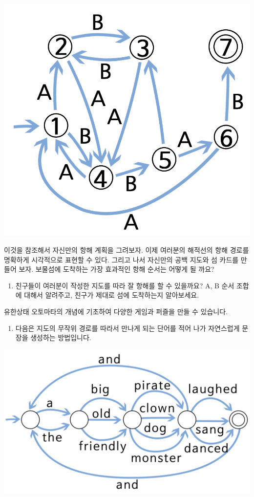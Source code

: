 \documentclass[]{article}
\begin{document}
\includegraphics{csunplugged/03-part/img/ch12-fsm/11-fsm-06-worksheet-01.png}

이것을 참조해서 자신만의 항해 계획을 그려보자. 이제 여러분의 해적선의
항해 경로를 명확하게 시각적으로 표현할 수 있다. 그리고 나서 자신만의
공백 지도와 섬 카드를 만들어 보자. 보물섬에 도착하는 가장 효과적인 항해
순서는 어떻게 될 까요?

\begin{enumerate}
\itemsep1pt\parskip0pt
\item
  친구들이 여러분이 작성한 지도를 따라 잘 항해를 할 수 있을까요? A, B
  순서 조합에 대해서 알려주고, 친구가 제대로 섬에 도착하는지 알아보세요.
\end{enumerate}

유한상태 오토마타의 개념에 기초하여 다양한 게임과 퍼즐을 만들 수
있습니다.

\begin{enumerate}
\itemsep1pt\parskip0pt
\item
  다음은 지도의 무작위 경로를 따라서 만나게 되는 단어를 적어 나가
  자연스럽게 문장을 생성하는 방법입니다.
\end{enumerate}

\includegraphics{csunplugged/03-part/img/ch12-fsm/11-fsm-06-worksheet-02.png}
\end{document}
